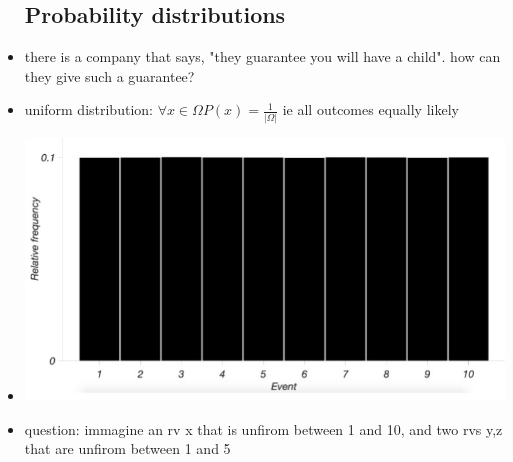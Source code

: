 \documentclass{article}
\begin{document}
\begin{itemize}
\subsection{Probability distributions }
\item there is a company that says, "they guarantee you will have a child". how can they give such a guarantee? 
\item uniform distribution: $\forall x \in \Omega P(x)=\frac{1}{|\Omega|}$ ie all outcomes equally likely 
\item \includegraphics[width=15cm]{Final_Review/Lecture_2/uniform_1.jpg}

\item question: immagine an rv x that is unfirom between 1 and 10, and two rvs y,z that are unfirom between 1 and 5


\end{itemize}
\end{document}
